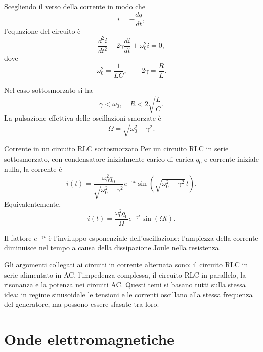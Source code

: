 \documentclass[a4paper]{article}
\begin{document}
Scegliendo il verso della corrente in modo che
\[
i=-\frac{dq}{dt},
\]
l'equazione del circuito è
\[
\frac{d^2i}{dt^2}+2\gamma\frac{di}{dt}+\omega_0^2i=0,
\]
dove
\[
\omega_0^2=\frac{1}{LC},
\qquad
2\gamma=\frac{R}{L}.
\]

Nel caso sottosmorzato si ha
\[
\gamma<\omega_0,
\quad
R<2\sqrt{\frac{L}{C}}.
\]
La pulsazione effettiva delle oscillazioni smorzate è
\[
\Omega=\sqrt{\omega_0^2-\gamma^2}.
\]

\begin{snippettheorem}{Corrente in un circuito RLC sottosmorzato}
Per un circuito RLC in serie sottosmorzato, con condensatore inizialmente carico di carica \(q_0\) e corrente iniziale nulla, la corrente è
\[
    i(t)=\frac{\omega_0^2q_0}{\sqrt{\omega_0^2-\gamma^2}}e^{-\gamma t}\sin\left(\sqrt{\omega_0^2-\gamma^2}\,t\right).
\]
Equivalentemente,
\[
    i(t)=\frac{\omega_0^2q_0}{\Omega}e^{-\gamma t}\sin(\Omega t).
\]
\end{snippettheorem}

Il fattore \(e^{-\gamma t}\) è l'inviluppo esponenziale dell'oscillazione: l'ampiezza della corrente diminuisce nel tempo a causa della dissipazione Joule nella resistenza.

\begin{center}
\end{center}

Gli argomenti collegati ai circuiti in corrente alternata sono: il circuito RLC in serie alimentato in AC, l'impedenza complessa, il circuito RLC in parallelo, la risonanza e la potenza nei circuiti AC. Questi temi si basano tutti sulla stessa idea: in regime sinusoidale le tensioni e le correnti oscillano alla stessa frequenza del generatore, ma possono essere sfasate tra loro.

\section{Onde elettromagnetiche}
\end{document}
